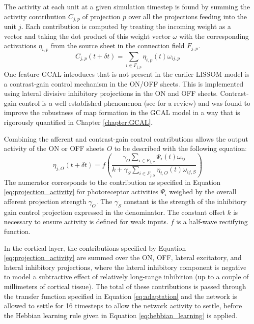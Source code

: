 \documentclass[phd,ianc,twoside]{infthesis}
\begin{document}
The activity at each unit at a given simulation timestep is found by
summing the activity contribution $C_{j,p}$ of projection $p$ over all
the projections feeding into the unit $j$. Each contribution is computed
by treating the incoming weight as a vector and taking the dot product
of this weight vector $\omega$ with the corresponding activations
$\eta_{i,p}$ from the source sheet in the connection field $F_{j,p}$.
\begin{equation}
  \label{eq:projection_activity}
C_{j,p}(t+\delta t) = \sum_{i \in F_{j,p}} \eta_{i,p}(t) \omega_{ij,p}
\end{equation}
One feature GCAL introduces that is not present in the earlier LISSOM model is a
contrast-gain control mechanism in the ON/OFF sheets. This is
implemented using lateral divisive inhibitory projections in the ON and
OFF sheets. Contrast-gain control is a well established phenomenon (see
\citealt{carandini_nature12} for a review) and was found to improve the
robustness of map formation in the GCAL model in a way that is
rigorously quantified in Chapter \ref{chapter:GCAL}.

Combining the afferent and contrast-gain control contributions allows
the output activity of the ON or OFF sheets $O$ to be described with the
following equation:
\begin{equation}
  \label{eq:ON_OFF_activity}
  \eta_{j,O} (t + \delta t) = f \left(
  \frac{\gamma_O \sum_{i \in F_{j,P}} \Psi_i (t) \omega_{ij}}
       {k + \gamma_S \sum_{i \in F_{j,S}} \eta_{i,O} (t) \omega_{ij,S}} \right)
\end{equation}
The numerator corresponds to the contribution as specified in Equation
\ref{eq:projection_activity} for photoreceptor activities $\Psi_i$ weighed
by the overall afferent projection strength $\gamma_O$. The $\gamma_S$
constant is the strength of the inhibitory gain control projection
expressed in the denominator. The constant offset $k$ is necessary to
ensure activity is defined for weak inputs. $f$ is a half-wave
rectifying function.

In the cortical layer, the contributions specified by Equation
\ref{eq:projection_activity} are summed over the ON, OFF, lateral
excitatory, and lateral inhibitory projections, where the lateral
inhibitory component is negative to model a subtractive effect of
relatively long-range
inhibition (up to a couple of millimeters of cortical tissue). The
total of these contributions is passed through the 
transfer function specified in Equation \ref{eq:adaptation} and the
network is allowed to settle for 16 timesteps to allow the network activity to settle, before the Hebbian learning rule given in Equation
\ref{eq:hebbian_learning} is applied.
\end{document}
